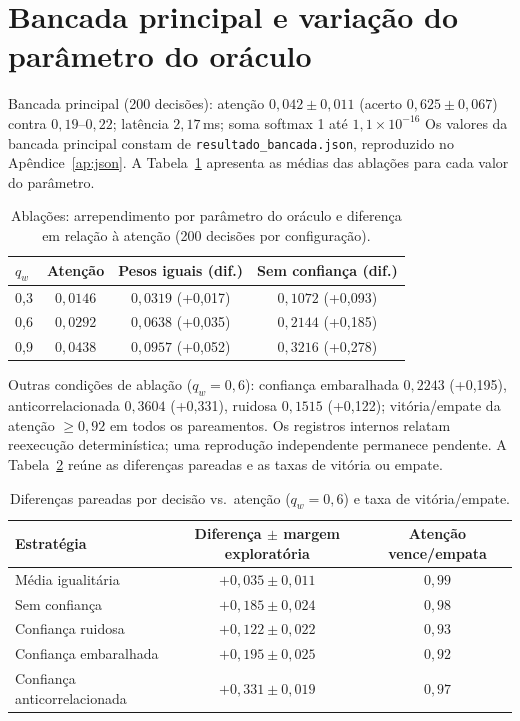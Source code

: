 \section{Bancada principal e variação do parâmetro do oráculo}
Bancada principal (200 decisões): atenção $0{,}042\pm0{,}011$ (acerto $0{,}625\pm0{,}067$) contra $0{,}19$--$0{,}22$; latência $2{,}17$\,ms; soma softmax 1 até $1{,}1\times10^{-16}$ Os valores da bancada principal constam de \nolinkurl{resultado_bancada.json}, reproduzido no Apêndice~\ref{ap:json}.
A Tabela~\ref{tab:bench} apresenta as médias das ablações para cada valor do parâmetro.
\begin{table}[htbp]
\fontsize{10}{12}\selectfont\SingleSpacing
\centering
\caption{Ablações: arrependimento por parâmetro do oráculo e diferença em relação à atenção (200 decisões por configuração).}
\label{tab:bench}
\begin{tabular}{lccc}
\toprule
$q_w$ & Atenção & Pesos iguais (dif.) & Sem confiança (dif.) \\
\midrule
0,3 & $0{,}0146$ & $0{,}0319$ (+0,017) & $0{,}1072$ (+0,093) \\
0,6 & $0{,}0292$ & $0{,}0638$ (+0,035) & $0{,}2144$ (+0,185) \\
0,9 & $0{,}0438$ & $0{,}0957$ (+0,052) & $0{,}3216$ (+0,278) \\
\bottomrule
\end{tabular}
\end{table}
Outras condições de ablação ($q_w=0{,}6$): confiança embaralhada $0{,}2243$ (+0,195), anticorrelacionada $0{,}3604$ (+0,331), ruidosa $0{,}1515$ (+0,122); vitória/empate da atenção $\geq 0{,}92$ em todos os pareamentos. Os registros internos relatam reexecução determinística; uma reprodução independente permanece pendente. A Tabela~\ref{tab:pareado} reúne as diferenças pareadas e as taxas de vitória ou empate.
\begin{table}[htbp]
\fontsize{10}{12}\selectfont\SingleSpacing
\centering
\caption{Diferenças pareadas por decisão vs.\ atenção ($q_w=0{,}6$) e taxa de vitória/empate.}
\label{tab:pareado}
\begin{tabular}{lcc}
\toprule
Estratégia & Diferença $\pm$ margem exploratória & Atenção vence/empata \\
\midrule
Média igualitária & $+0{,}035\pm0{,}011$ & $0{,}99$ \\
Sem confiança & $+0{,}185\pm0{,}024$ & $0{,}98$ \\
Confiança ruidosa & $+0{,}122\pm0{,}022$ & $0{,}93$ \\
Confiança embaralhada & $+0{,}195\pm0{,}025$ & $0{,}92$ \\
Confiança anticorrelacionada & $+0{,}331\pm0{,}019$ & $0{,}97$ \\
\bottomrule
\end{tabular}
\end{table}
